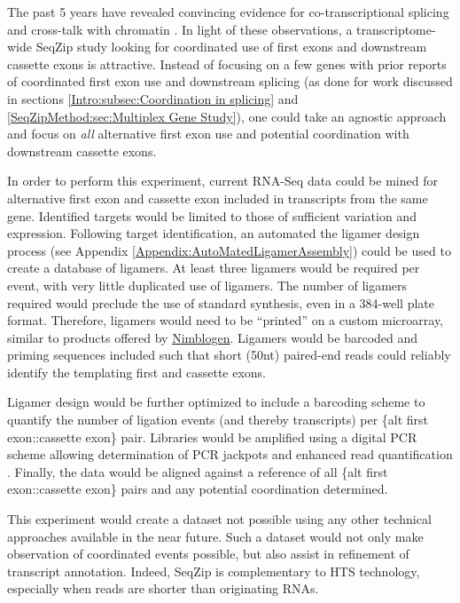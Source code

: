     The past 5 years have revealed convincing evidence for co-transcriptional splicing and cross-talk with chromatin \citep{Brown2012,Luco2011a,Schwartz2010,Kolasinska-Zwierz2009}. In light of these observations, a transcriptome-wide SeqZip study looking for coordinated use of first exons and downstream cassette exons is attractive. Instead of focusing on a few genes with prior reports of coordinated first exon use and downstream splicing (as done for work discussed in sections \ref{Intro:subsec:Coordination in splicing} and \ref{SeqZipMethod:sec:Multiplex Gene Study}), one could take an agnostic approach and focus on \textit{all} alternative first exon use and potential coordination with downstream cassette exons.

    In order to perform this experiment, current RNA-Seq data could be mined for alternative first exon and cassette exon included in transcripts from the same gene. Identified targets would be limited to those of sufficient variation and expression. Following target identification, an automated the ligamer design process (see Appendix \ref{Appendix:AutoMatedLigamerAssembly}) could be used to create a database of ligamers. At least three ligamers would be required per event, with very little duplicated use of ligamers. The number of ligamers required would preclude the use of standard synthesis, even in a 384-well plate format. Therefore, ligamers would need to be ``printed'' on a custom microarray, similar to products offered by \href{http://www.nimblegen.com/}{Nimblogen}. Ligamers would be barcoded and priming sequences included such that short (50nt) paired-end reads could reliably identify the templating first and cassette exons.

    Ligamer design would be further optimized to include a barcoding scheme to quantify the number of ligation events (and thereby transcripts) per \{alt first exon::cassette exon\} pair. Libraries would be amplified using a digital PCR scheme allowing determination of PCR jackpots and enhanced read quantification \citep{Shiroguchi2012a}. Finally, the data would be aligned against a reference of all \{alt first exon::cassette exon\} pairs and any potential coordination determined.

    This experiment would create a dataset not possible using any other technical approaches available in the near future. Such a dataset would not only make observation of coordinated events possible, but also assist in refinement of transcript annotation. Indeed, SeqZip is complementary to HTS technology, especially when reads are shorter than originating RNAs.

